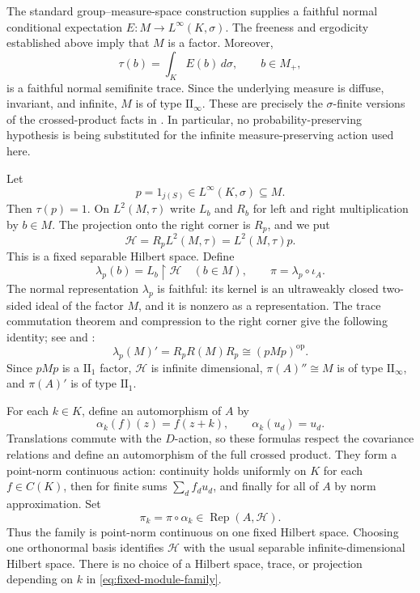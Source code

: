 \documentclass[11pt]{article}
\numberwithin{equation}{section}
\theoremstyle{definition}
\newcommand{\Rep}{\operatorname{Rep}}
\begin{document}
The standard group--measure-space construction supplies a faithful
normal conditional expectation $E:M\to L^\infty(K,\sigma)$.
The freeness and ergodicity established above imply that $M$ is a
factor. Moreover,
\[
 \tau(b)=\int_K E(b)\,d\sigma,\qquad b\in M_+,
\]
is a faithful normal semifinite trace. Since the underlying measure is
diffuse, invariant, and infinite, $M$ is of type $\mathrm{II}_\infty$.
These are precisely the $\sigma$-finite versions of the crossed-product
facts in \cite[Theorems~5.2.2 and~5.2.4]{Peterson}. In particular, no
probability-preserving hypothesis is being substituted for the infinite
measure-preserving action used here.

Let
\[
 p=1_{j(S)}\in L^\infty(K,\sigma)\subseteq M.
\]
Then $\tau(p)=1$. On $L^2(M,\tau)$ write $L_b$ and $R_b$ for left
and right multiplication by $b\in M$. The projection onto the right
corner is $R_p$, and we put
\[
 \mathcal H=R_pL^2(M,\tau)=L^2(M,\tau)p.
\]
This is a fixed separable Hilbert space. Define
\[
 \lambda_p(b)=L_b\mathbin{\upharpoonright}\mathcal H\quad(b\in M),
 \qquad \pi=\lambda_p\circ\iota_A.
\]
The normal representation $\lambda_p$ is faithful: its kernel is an
ultraweakly closed two-sided ideal of the factor $M$, and it is nonzero
as a representation. The trace commutation theorem and compression to the right
corner give the following identity; see \cite[Remark~5.15]{Hiai20}
and \cite[Lemma~3.3.8]{Peterson}:
\[
 \lambda_p(M)'=R_pR(M)R_p\cong(pMp)^{\mathrm{op}}.
\]
Since $pMp$ is a $\mathrm{II}_1$ factor, $\mathcal H$ is infinite
dimensional, $\pi(A)''\cong M$ is of type $\mathrm{II}_\infty$, and
$\pi(A)'$ is of type $\mathrm{II}_1$.

For each $k\in K$, define an automorphism of $A$ by
\[
 \alpha_k(f)(z)=f(z+k),\qquad \alpha_k(u_d)=u_d.
\]
Translations commute with the $D$-action, so these formulas respect
the covariance relations and define an automorphism of the full crossed
product. They form a point-norm continuous action: continuity holds
uniformly on $K$ for each $f\in C(K)$, then for finite sums $\sum_d f_du_d$,
and finally for all of $A$ by norm approximation. Set
\begin{equation}
 \pi_k=\pi\circ\alpha_k\in\Rep(A,\mathcal H).
 \label{eq:fixed-module-family}
\end{equation}
Thus the family is point-norm continuous on one fixed Hilbert space.
Choosing one orthonormal basis identifies $\mathcal H$ with the usual
separable infinite-dimensional Hilbert space. There is no choice of a
Hilbert space, trace, or projection depending on $k$ in
\eqref{eq:fixed-module-family}.
\end{document}
